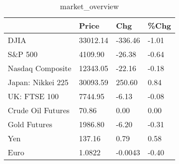 \documentclass{article}%
\begin{document}
%


\begin{table}[htbp]%
\caption{market\_overview}%
\centering%
\begin{adjustbox}{width=1\textwidth}%
\begin{tabular}{llll}
\toprule
                  &    Price &     Chg &  \%Chg \\
\midrule
             DJIA & 33012.14 & -336.46 & -1.01 \\
          S\&P 500 &  4109.90 &  -26.38 & -0.64 \\
 Nasdaq Composite & 12343.05 &  -22.16 & -0.18 \\
Japan: Nikkei 225 & 30093.59 &  250.60 &  0.84 \\
     UK: FTSE 100 &  7744.95 &   -6.13 & -0.08 \\
Crude Oil Futures &    70.86 &    0.00 &  0.00 \\
     Gold Futures &  1986.80 &   -6.20 & -0.31 \\
              Yen &   137.16 &    0.79 &  0.58 \\
             Euro &   1.0822 & -0.0043 & -0.40 \\
\bottomrule
\end{tabular}
%
\end{adjustbox}%
\end{table}

%
\end{document}
